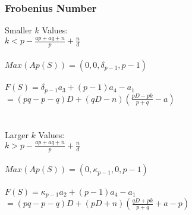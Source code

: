 \documentclass{beamer}
\begin{document}
\begin{frame}[noframenumbering]
\begin{center}
\frametitle{Frobenius Number}

Smaller $k$ Values:\\
{\footnotesize
$k < p - \frac{a p + a q + n}{p} + \frac{n}{d}$\\

~\\

$Max(Ap(S)) = \left(0, 0, \delta _ {p - 1}, p - 1\right)$\\

~\\

$F(S) = \delta _ {p - 1} a_3 + \left( p - 1 \right) a_4 - a_1$\\
$ = \left( p q - p - q \right) D + \left( q D - n \right) \left( \frac{p D - p k}{p + q} - a \right)$
}\\

~\\

~\\

Larger $k$ Values:\\
{\footnotesize
$k > p - \frac{a p + a q + n}{p} + \frac{n}{d}$\\

~\\

$Max(Ap(S)) = \left(0, \kappa _ {p - 1}, 0, p - 1\right)$\\

~\\

$F(S) = \kappa _ {p - 1} a_2 + \left( p - 1 \right) a_4 - a_1$\\
$ = \left( p q - p - q \right) D + \left( p D + n \right) \left( \frac{q D + p k}{p + q} + a - p \right)$
}

\end{center}
\end{frame}

\end{document}
